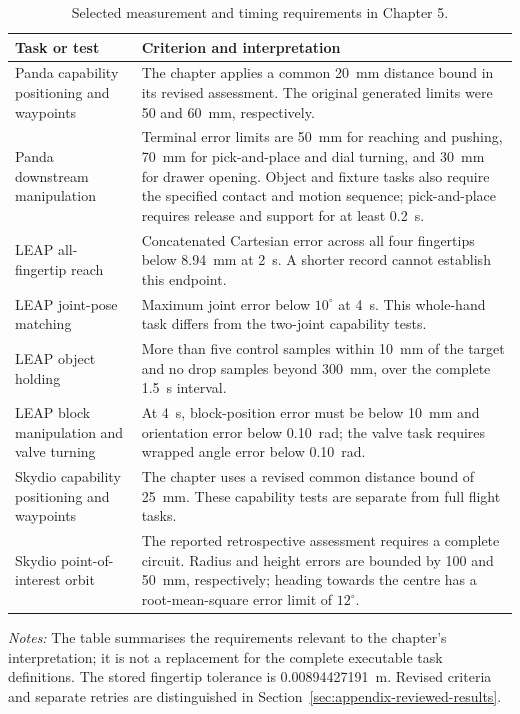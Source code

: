 \begin{table}[H]
  \centering
  \begingroup
  \small
  \setlength{\tabcolsep}{4pt}
  \renewcommand{\arraystretch}{1.18}
  \caption{Selected measurement and timing requirements in Chapter 5.}
  \label{tab:appendix-task-criteria}
  \begin{tabularx}{\textwidth}{@{}>{\raggedright\arraybackslash}p{35mm}
    >{\raggedright\arraybackslash}X@{}}
    \toprule
    \textbf{Task or test} & \textbf{Criterion and interpretation} \\
    \midrule
    Panda capability positioning and waypoints &
    The chapter applies a common 20~mm distance bound in its revised
    assessment. The original generated limits were 50 and 60~mm,
    respectively. \\
    Panda downstream manipulation &
    Terminal error limits are 50~mm for reaching and pushing, 70~mm for
    pick-and-place and dial turning, and 30~mm for drawer opening.
    Object and fixture tasks also require the specified contact and motion
    sequence; pick-and-place requires release and support for at least 0.2~s. \\
    LEAP all-fingertip reach &
    Concatenated Cartesian error across all four fingertips below
    8.94~mm at 2~s. A shorter record cannot establish this endpoint. \\
    LEAP joint-pose matching &
    Maximum joint error below $10^\circ$ at 4~s.
    This whole-hand task differs from the two-joint capability tests. \\
    LEAP object holding &
    More than five control samples within 10~mm of the target and no
    drop samples beyond 300~mm, over the complete 1.5~s interval. \\
    LEAP block manipulation and valve turning &
    At 4~s, block-position error must be below 10~mm and orientation
    error below 0.10~rad; the valve task requires wrapped angle error
    below 0.10~rad. \\
    Skydio capability positioning and waypoints &
    The chapter uses a revised common distance bound of 25~mm.
    These capability tests are separate from full flight tasks. \\
    Skydio point-of-interest orbit &
    The reported retrospective assessment requires a complete circuit.
    Radius and height errors are bounded by 100 and 50~mm, respectively;
    heading towards the centre has a root-mean-square error limit of
    $12^\circ$. \\
    \bottomrule
  \end{tabularx}
  \par\smallskip
  \noindent\raggedright\emph{Notes:} The table summarises the requirements
  relevant to the chapter's interpretation; it is not a replacement for the
  complete executable task definitions. The stored fingertip tolerance is
  0.00894427191~m. Revised criteria and separate retries are distinguished
  in Section~\ref{sec:appendix-reviewed-results}.\par
  \endgroup
\end{table}

